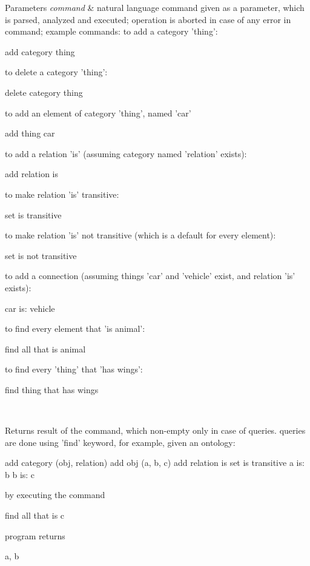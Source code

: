 \begin{DoxyParams}{\-Parameters}
{\em command} & natural language command given as a parameter, which is parsed, analyzed and executed; operation is aborted in case of any error in command; example commands\-: to add a category 'thing'\-: 
\begin{DoxyCode}
 add category thing 
\end{DoxyCode}
 to delete a category 'thing'\-: 
\begin{DoxyCode}
 delete category thing 
\end{DoxyCode}
 to add an element of category 'thing', named 'car' 
\begin{DoxyCode}
 add thing car 
\end{DoxyCode}
 to add a relation 'is' (assuming category named 'relation' exists)\-: 
\begin{DoxyCode}
 add relation is 
\end{DoxyCode}
 to make relation 'is' transitive\-: 
\begin{DoxyCode}
 set is transitive 
\end{DoxyCode}
 to make relation 'is' not transitive (which is a default for every element)\-: 
\begin{DoxyCode}
 set is not transitive 
\end{DoxyCode}
 to add a connection (assuming things 'car' and 'vehicle' exist, and relation 'is' exists)\-: 
\begin{DoxyCode}
 car is: vehicle 
\end{DoxyCode}
 to find every element that 'is animal'\-: 
\begin{DoxyCode}
 find all that is animal 
\end{DoxyCode}
 to find every 'thing' that 'has wings'\-: 
\begin{DoxyCode}
 find thing that has wings 
\end{DoxyCode}
 \\
\hline
\end{DoxyParams}
\begin{DoxyReturn}{\-Returns}
result of the command, which non-\/empty only in case of queries. queries are done using 'find' keyword, for example, given an ontology\-: 
\begin{DoxyCode}
 add category (obj, relation)
      add obj (a, b, c)
      add relation is
      set is transitive
      a is: b
      b is: c
\end{DoxyCode}
 by executing the command 
\begin{DoxyCode}
 find all that is c 
\end{DoxyCode}
 program returns 
\begin{DoxyCode}
 a, b 
\end{DoxyCode}
 
\end{DoxyReturn}


